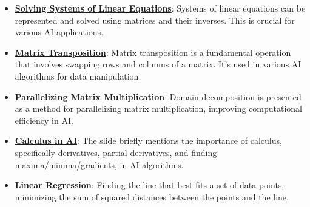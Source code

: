 \documentclass{article}%
\begin{document}
\begin{itemize}[leftmargin=*]
\item \href{https://purdue.brightspace.com/d2l/common/assets/pdfjs-d2l-dist/1.0.14-legacy/web/viewer.html?file=\%2Fcontent\%2Fenforced\%2F1095467-wl.202510.CS.24300.001\%2F04L1-Linear Algebra Primer.pdf\%3Fou\%3D1095467\&lang=en-us\&container=d2l-fileviewer-rendered-pdf\&fullscreen=d2l-fileviewer-rendered-pdf-dialog\&height=667#page=11}{\textbf{Solving Systems of Linear Equations}}: Systems of linear equations can be represented and solved using matrices and their inverses. This is crucial for various AI applications.%
\item \href{https://purdue.brightspace.com/d2l/common/assets/pdfjs-d2l-dist/1.0.14-legacy/web/viewer.html?file=\%2Fcontent\%2Fenforced\%2F1095467-wl.202510.CS.24300.001\%2F04L1-Linear Algebra Primer.pdf\%3Fou\%3D1095467\&lang=en-us\&container=d2l-fileviewer-rendered-pdf\&fullscreen=d2l-fileviewer-rendered-pdf-dialog\&height=667#page=16}{\textbf{Matrix Transposition}}: Matrix transposition is a fundamental operation that involves swapping rows and columns of a matrix. It's used in various AI algorithms for data manipulation.%
\item \href{https://purdue.brightspace.com/d2l/common/assets/pdfjs-d2l-dist/1.0.14-legacy/web/viewer.html?file=\%2Fcontent\%2Fenforced\%2F1095467-wl.202510.CS.24300.001\%2F04L1-Linear Algebra Primer.pdf\%3Fou\%3D1095467\&lang=en-us\&container=d2l-fileviewer-rendered-pdf\&fullscreen=d2l-fileviewer-rendered-pdf-dialog\&height=667#page=18}{\textbf{Parallelizing Matrix Multiplication}}: Domain decomposition is presented as a method for parallelizing matrix multiplication, improving computational efficiency in AI.%
\item \href{https://purdue.brightspace.com/d2l/common/assets/pdfjs-d2l-dist/1.0.14-legacy/web/viewer.html?file=\%2Fcontent\%2Fenforced\%2F1095467-wl.202510.CS.24300.001\%2F04L1-Linear Algebra Primer.pdf\%3Fou\%3D1095467\&lang=en-us\&container=d2l-fileviewer-rendered-pdf\&fullscreen=d2l-fileviewer-rendered-pdf-dialog\&height=667#page=19}{\textbf{Calculus in AI}}: The slide briefly mentions the importance of calculus, specifically derivatives, partial derivatives, and finding maxima/minima/gradients, in AI algorithms.%
\item \href{https://purdue.brightspace.com/d2l/common/assets/pdfjs-d2l-dist/1.0.14-legacy/web/viewer.html?file=\%2Fcontent\%2Fenforced\%2F1095467-wl.202510.CS.24300.001\%2F05L2-ML Basics.pdf\%3Fou\%3D1095467\&lang=en-us\&container=d2l-fileviewer-rendered-pdf\&fullscreen=d2l-fileviewer-rendered-pdf-dialog\&height=667#page=6}{\textbf{Linear Regression}}: Finding the line that best fits a set of data points, minimizing the sum of squared distances between the points and the line.%

\end{itemize}
\end{document}
